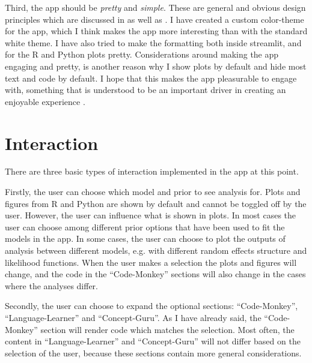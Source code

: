 \documentclass[12pt]{article}
\begin{document}
\vspace{5mm}

Third, the app should be \emph{pretty} and \emph{simple}. These are general
and obvious design principles which are discussed in
\textcite{tractinsky2000beautiful} as well as
\textcite[25-26]{hassenzahl2010experience}.
I have created a custom color-theme for the app, which I think makes the app more interesting
than with the standard white theme. I have also tried to make the formatting both inside
streamlit, and for the R and Python plots pretty. Considerations around making
the app engaging
and pretty, is another reason why I show plots by default and hide most text and code by default.
I hope that this makes the app pleasurable to engage with,
something that is understood to be an important driver
in creating an enjoyable experience \autocite[65]{hassenzahl2010experience}.

\section{Interaction}
There are three basic types of interaction implemented in the app at this point.

\vspace{5mm}

Firstly, the user can choose which model and prior to see analysis for.
Plots and figures from R and Python are shown by default and cannot be toggled off by the user.
However, the user can influence what is shown in plots. In most cases the user can choose
among different prior options that have been used to fit the models in the app.
In some cases, the user can choose to plot the outputs of analysis between different models,
e.g. with different random effects structure and likelihood functions.
When the user makes a selection the plots and figures will change,
and the code in the “Code-Monkey” sections will also change in the cases where the analyses differ.

\vspace{5mm}

Secondly, the user can choose to expand the optional sections:
“Code-Monkey”, “Language-Learner” and “Concept-Guru”.
As I have already said, the “Code-Monkey” section will render code which matches the selection.
Most often, the content in “Language-Learner” and “Concept-Guru” will not differ
based on the selection of the user, because these sections contain more general considerations.

\vspace{5mm}
\end{document}
